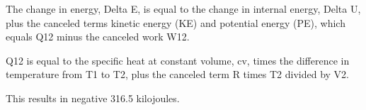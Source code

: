 The change in energy, Delta E, is equal to the change in internal energy, Delta U, plus the canceled terms kinetic energy (KE) and potential energy (PE), which equals Q12 minus the canceled work W12.

Q12 is equal to the specific heat at constant volume, cv, times the difference in temperature from T1 to T2, plus the canceled term R times T2 divided by V2.

This results in negative 316.5 kilojoules.